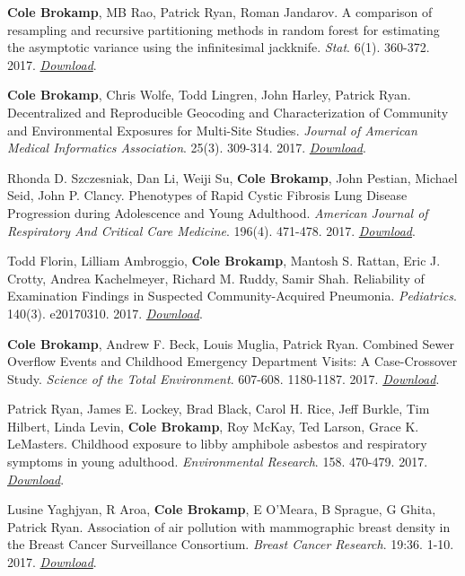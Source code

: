 \textbf{Cole Brokamp}, MB Rao, Patrick Ryan, Roman Jandarov. A
comparison of resampling and recursive partitioning methods in random
forest for estimating the asymptotic variance using the infinitesimal
jackknife. \emph{Stat}. 6(1). 360-372. 2017.
\href{https://colebrokamp-website.s3.amazonaws.com/publications/Brokamp_Stat_2017.pdf}{\emph{Download}}.

\textbf{Cole Brokamp}, Chris Wolfe, Todd Lingren, John Harley, Patrick
Ryan. Decentralized and Reproducible Geocoding and Characterization of
Community and Environmental Exposures for Multi-Site Studies.
\emph{Journal of American Medical Informatics Association}. 25(3).
309-314. 2017.
\href{https://colebrokamp-website.s3.amazonaws.com/publications/Brokamp_JAMIA_2017.pdf}{\emph{Download}}.

Rhonda D. Szczesniak, Dan Li, Weiji Su, \textbf{Cole Brokamp}, John
Pestian, Michael Seid, John P. Clancy. Phenotypes of Rapid Cystic
Fibrosis Lung Disease Progression during Adolescence and Young
Adulthood. \emph{American Journal of Respiratory And Critical Care
Medicine}. 196(4). 471-478. 2017.
\href{https://colebrokamp-website.s3.amazonaws.com/publications/Szczesniak_AJRCCM_2017.pdf}{\emph{Download}}.

Todd Florin, Lilliam Ambroggio, \textbf{Cole Brokamp}, Mantosh S.
Rattan, Eric J. Crotty, Andrea Kachelmeyer, Richard M. Ruddy, Samir
Shah. Reliability of Examination Findings in Suspected
Community-Acquired Pneumonia. \emph{Pediatrics}. 140(3). e20170310.
2017.
\href{https://colebrokamp-website.s3.amazonaws.com/publications/Florin_Pediatrics_2017.pdf}{\emph{Download}}.

\textbf{Cole Brokamp}, Andrew F. Beck, Louis Muglia, Patrick Ryan.
Combined Sewer Overflow Events and Childhood Emergency Department
Visits: A Case-Crossover Study. \emph{Science of the Total Environment}.
607-608. 1180-1187. 2017.
\href{http://colebrokamp-website.s3.amazonaws.com/publications/Brokamp_STOTEN_2017.pdf}{\emph{Download}}.

Patrick Ryan, James E. Lockey, Brad Black, Carol H. Rice, Jeff Burkle,
Tim Hilbert, Linda Levin, \textbf{Cole Brokamp}, Roy McKay, Ted Larson,
Grace K. LeMasters. Childhood exposure to libby amphibole asbestos and
respiratory symptoms in young adulthood. \emph{Environmental Research}.
158. 470-479. 2017.
\href{http://colebrokamp-website.s3.amazonaws.com/publications/Ryan_EnvRes_2017.pdf}{\emph{Download}}.

Lusine Yaghjyan, R Aroa, \textbf{Cole Brokamp}, E O'Meara, B Sprague, G
Ghita, Patrick Ryan. Association of air pollution with mammographic
breast density in the Breast Cancer Surveillance Consortium.
\emph{Breast Cancer Research}. 19:36. 1-10. 2017.
\href{http://colebrokamp-website.s3.amazonaws.com/publications/Yaghjyan_2017_BreastCancerResearch.pdf}{\emph{Download}}.

